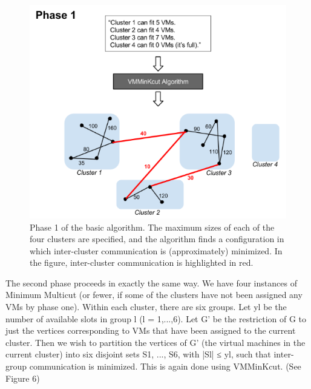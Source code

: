 \documentclass[11pt]{article}
\begin{document}
\begin{figure}
  \centering
\includegraphics[scale=0.7]{phase1.png}

 \caption{Phase 1 of the basic algorithm.  The maximum sizes of each of the four clusters are specified, and the algorithm finds a configuration in which inter-cluster communication is (approximately) minimized.  In the figure, inter-cluster communication is highlighted in red.}
 
\end{figure}

The second phase proceeds in exactly the same way.  We have four instances of Minimum Multicut (or fewer, if some of the clusters have not been assigned any VMs by phase one).  Within each cluster, there are six groups.  Let yl be the number of available slots in group l (l = 1,...,6).  Let G' be the restriction of G to just the vertices corresponding to VMs that have been assigned to the current cluster.  Then we wish to partition the vertices of G’ (the virtual machines in the current cluster) into six disjoint sets S1, ..., S6, with |Sl| ≤ yl, such that inter-group communication is minimized.  This is again done using VMMinKcut.  (See Figure 6)
\end{document}
